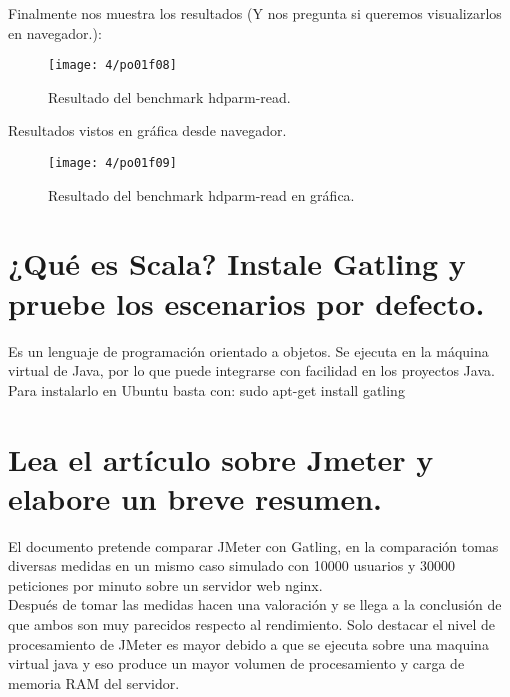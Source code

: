 Finalmente nos muestra los resultados (Y nos pregunta si queremos visualizarlos en navegador.):
\begin{figure}[H]
\centering
\texttt{[image: 4/po01f08]}
\caption{Resultado del benchmark hdparm-read.}
\label{fig:f34}
\end{figure}

Resultados vistos en gráfica desde navegador.
\begin{figure}[H]
\centering
\texttt{[image: 4/po01f09]}
\caption{Resultado del benchmark hdparm-read en gráfica.}
\label{fig:f35}
\end{figure}


\section{¿Qué es Scala? Instale Gatling y pruebe los escenarios por defecto. \cite{c10}}

Es un lenguaje de programación orientado a objetos. Se ejecuta en la máquina virtual de Java, por lo que puede integrarse con facilidad en los proyectos Java.\\

Para instalarlo en Ubuntu basta con: sudo apt-get install gatling\\


\section{Lea el artículo sobre Jmeter y elabore un breve resumen.}
El documento pretende comparar JMeter con Gatling, en la comparación tomas diversas medidas en un mismo caso simulado con 10000 usuarios y 30000 peticiones por minuto sobre un servidor web nginx.\\

Después de tomar las medidas hacen una valoración y se llega a la conclusión de que ambos son muy parecidos respecto al rendimiento. Solo destacar el nivel de procesamiento de JMeter es mayor debido a que se ejecuta sobre una maquina virtual java y eso produce un mayor volumen de procesamiento y carga de memoria RAM del servidor.

